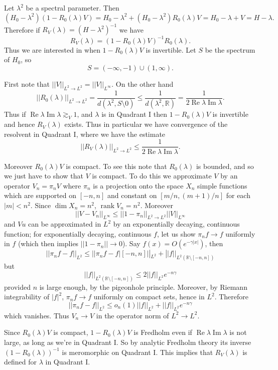 \documentclass[12pt]{report}
\newcommand{\RR}{\mathbb{R}}
\DeclareMathOperator{\rank}{rank}
\renewcommand{\Re}{\operatorname{Re}}
\renewcommand{\Im}{\operatorname{Im}}
\theoremstyle{definition}
\begin{document}
Let $\lambda^2$ be a spectral parameter.
Then
$$(H_0 - \lambda^2)(1 - R_0(\lambda)V) = H_0 - \lambda^2 + (H_0 - \lambda^2)R_0(\lambda)V = H_0 - \lambda + V = H - \lambda.$$
Therefore if $R_V(\lambda) = (H - \lambda^2)^{-1}$ we have
$$R_V(\lambda) = (1 - R_0(\lambda)V)^{-1}R_0(\lambda).$$
Thus we are interested in when $1 - R_0(\lambda)V$ is invertible.
Let $S$ be the spectrum of $H_0$, so
$$S = (-\infty, -1) \cup (1, \infty).$$

First note that $||V||_{L^2 \to L^2} = ||V||_{L^\infty}$. On the other hand
$$||R_0(\lambda)||_{L^2 \to L^2} = \frac{1}{d(\lambda^2, S \setminus 0)} \leq \frac{1}{d(\lambda^2, \RR)} = \frac{1}{2 \Re \lambda \Im \lambda}.$$
Thus if $\Re \lambda \Im \lambda \gtrsim_V 1$, and $\lambda$ is in Quadrant I then $1 - R_0(\lambda)V$ is invertible and hence $R_V(\lambda)$ exists.
Thus in particular we have convergence of the resolvent in Quadrant I, where we have the estimate
$$||R_V(\lambda)||_{L^2 \to L^2} \leq \frac{1}{2 \Re \lambda \Im \lambda}.$$

Moreover $R_0(\lambda)V$ is compact. To see this note that $R_0(\lambda)$ is bounded, and so we just have to show that $V$ is compact.
To do this we approximate $V$ by an operator $V_n = \pi_nV$ where $\pi_n$ is a projection onto the space $X_n$ simple functions which are supported on $[-n, n]$ and constant on $[m/n, (m+1)/n]$ for each $|m| < n^2$.
Since $\dim X_n = n^2$, $\rank V_n = n^2$. Moreover
$$||V - V_n||_{L^\infty} \leq ||1 - \pi_n||_{L^2 \to L^2} ||V||_{L^\infty}$$
and $Vu$ can be approximated in $L^2$ by an exponentially decaying, continuous function; for exponentially decaying, continuous $f$, let us show $\pi_nf \to f$ uniformly in $f$ (which then implies $||1 - \pi_n|| \to 0$).
Say $f(x) = O(e^{-\gamma|x|})$, then
$$||\pi_nf - f||_{L^2} \leq ||\pi_nf - f|[-n, n]||_{L^2} + ||f||_{L^2(\RR \setminus [-n, n])}$$
but
$$||f||_{L^2(\RR \setminus [-n, n])} \leq 2||f||_{L^2}e^{-n\gamma}$$
provided $n$ is large enough, by the pigeonhole principle.
Moreover, by Riemann integrability of $|f|^2$, $\pi_nf \to f$ uniformly on compact sets, hence in $L^2$. Therefore
$$||\pi_nf - f||_{L^2} \leq o_n(1)||f||_{L^2} + ||f||_{L^2}e^{-n\gamma}$$
which vanishes. Thus $V_n \to V$ in the operator norm of $L^2 \to L^2$.

Since $R_0(\lambda)V$ is compact, $1 - R_0(\lambda)V$ is Fredholm even if $\Re \lambda \Im \lambda$ is not large, as long as we're in Quadrant I.
So by analytic Fredholm theory its inverse $(1 - R_0(\lambda))^{-1}$ is meromorphic on Quadrant I.
This implies that $R_V(\lambda)$ is defined for $\lambda$ in Quadrant I.
\end{document}
